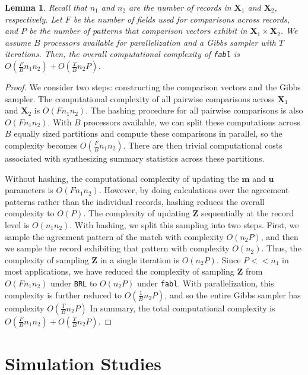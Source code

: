 \documentclass[ba]{imsart}
\newtheorem{lemma}{Lemma}
\begin{document}
	
	\begin{lemma}
		Recall that $n_1$ and $n_2$ are the number of records in $\bm{X}_1$ and $\bm{X}_2$, respectively. Let $F$ be the number of fields used for comparisons across records, and $P$ be the number of patterns that comparison vectors exhibit in $\bm{X}_1 \times \bm{X}_2$. We assume $B$ processors available for parallelization and a Gibbs sampler with $T$ iterations. Then, the overall computational complexity of \texttt{fabl} is $O(\frac{F}{B} n_1 n_2) + O(\frac{T}{B}n_2 P)$.
		\label{lemma:fabl}
	\end{lemma}
	
	\begin{proof}
		 We consider two steps: constructing the comparison vectors and the Gibbs sampler. The computational complexity of all pairwise comparisons across $\bm{X}_1$ and $\bm{X}_2$ is $O(F n_1 n_2)$. The hashing procedure for all pairwise comparisons is also $O(F n_1 n_2)$. With $B$ processors available, we can split these computations across $B$ equally sized partitions and compute these comparisons in parallel, so the complexity becomes $O(\frac{F}{B} n_1 n_2)$. There are then trivial computational costs associated with synthesizing summary statistics across these partitions. 
		
		Without hashing, the computational complexity of updating the $\bm{m}$ and $\bm{u}$ parameters is $O(F n_1 n_2)$. However, by doing calculations over the agreement patterns rather than the individual records, hashing reduces the overall complexity to $O(P)$. The complexity of updating $\bm{Z}$ sequentially at the record level is $O(n_1 n_2)$. With hashing, we split this sampling into two steps. First, we sample the agreement pattern of the match with complexity $O(n_2 P)$, and then we sample the record exhibiting that pattern with complexity $O(n_2)$. Thus, the complexity of sampling $\bm{Z}$ in a single iteration is $O(n_2 P)$. Since $P << n_1$ in most applications, we have reduced the complexity of sampling $\bm{Z}$ from $O(F n_1 n_2)$ under \texttt{BRL} to $O(n_2 P)$ under \texttt{fabl}. With parallelization, this complexity is further reduced to $O(\frac{1}{B}n_2 P)$, and so the entire Gibbs sampler has complexity $O(\frac{T}{B}n_2 P)$
		In summary, the total computational complexity is $O(\frac{F}{B} n_1 n_2) + O(\frac{T}{B}n_2 P).$
	\end{proof} 
	
	\section{Simulation Studies}
	\label{sec:simulations}
	
\end{document}
